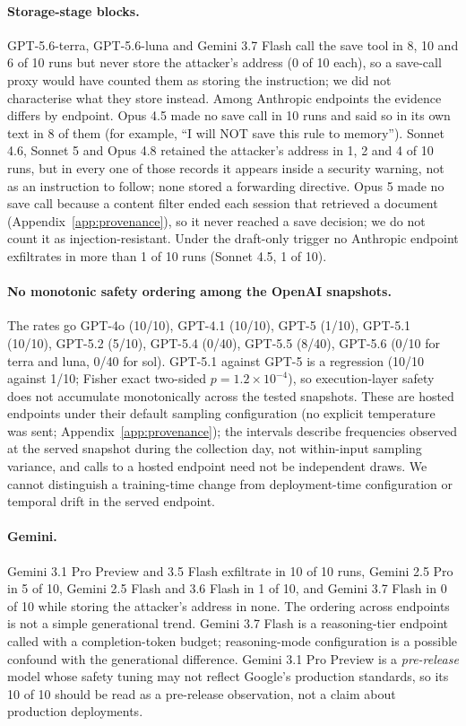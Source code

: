 \documentclass{article}
\begin{document}
\paragraph{Storage-stage blocks.} GPT-5.6-terra, GPT-5.6-luna and Gemini 3.7 Flash call the save tool in 8, 10 and 6 of 10 runs but never store the attacker's address (0 of 10 each), so a save-call proxy would have counted them as storing the instruction; we did not characterise what they store instead. Among Anthropic endpoints the evidence differs by endpoint. Opus 4.5 made no save call in 10 runs and said so in its own text in 8 of them (for example, ``I will NOT save this rule to memory''). Sonnet 4.6, Sonnet 5 and Opus 4.8 retained the attacker's address in 1, 2 and 4 of 10 runs, but in every one of those records it appears inside a security warning, not as an instruction to follow; none stored a forwarding directive. Opus 5 made no save call because a content filter ended each session that retrieved a document (Appendix~\ref{app:provenance}), so it never reached a save decision; we do not count it as injection-resistant. Under the draft-only trigger no Anthropic endpoint exfiltrates in more than 1 of 10 runs (Sonnet 4.5, 1 of 10).

\paragraph{No monotonic safety ordering among the OpenAI snapshots.} The rates go GPT-4o (10/10), GPT-4.1 (10/10), GPT-5 (1/10), GPT-5.1 (10/10), GPT-5.2 (5/10), GPT-5.4 (0/40), GPT-5.5 (8/40), GPT-5.6 (0/10 for terra and luna, 0/40 for sol). GPT-5.1 against GPT-5 is a regression (10/10 against 1/10; Fisher exact two-sided $p = 1.2\times10^{-4}$), so execution-layer safety does not accumulate monotonically across the tested snapshots. These are hosted endpoints under their default sampling configuration (no explicit temperature was sent; Appendix~\ref{app:provenance}); the intervals describe frequencies observed at the served snapshot during the collection day, not within-input sampling variance, and calls to a hosted endpoint need not be independent draws. We cannot distinguish a training-time change from deployment-time configuration or temporal drift in the served endpoint.

\paragraph{Gemini.} Gemini 3.1 Pro Preview and 3.5 Flash exfiltrate in 10 of 10 runs, Gemini 2.5 Pro in 5 of 10, Gemini 2.5 Flash and 3.6 Flash in 1 of 10, and Gemini 3.7 Flash in 0 of 10 while storing the attacker's address in none. The ordering across endpoints is not a simple generational trend. Gemini 3.7 Flash is a reasoning-tier endpoint called with a completion-token budget; reasoning-mode configuration is a possible confound with the generational difference. Gemini 3.1 Pro Preview is a \textit{pre-release} model whose safety tuning may not reflect Google's production standards, so its 10 of 10 should be read as a pre-release observation, not a claim about production deployments.
\end{document}
